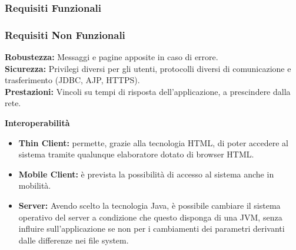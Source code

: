 \documentclass[a4paper,12pt]{beamer}
\begin{document}
\begin{frame}
\frametitle{Requisiti Funzionali}

\begin{center}
\end{center}

\end{frame}

\begin{frame}
\frametitle{Requisiti Non Funzionali}
\textbf{Robustezza:} Messaggi e pagine apposite in caso di errore. \\
\textbf{Sicurezza:} Privilegi diversi per gli utenti, protocolli diversi di comunicazione e trasferimento (JDBC, AJP, HTTPS). \\
\textbf{Prestazioni:} Vincoli su tempi di risposta dell'applicazione, a prescindere dalla rete.

\textbf{Interoperabilità}
\begin{itemize}
\item \textbf{Thin Client:} permette, grazie alla tecnologia HTML, di poter accedere al sistema tramite qualunque elaboratore dotato di browser HTML.
\item \textbf{Mobile Client:} è prevista la possibilità di accesso al sistema anche in mobilità.
\item \textbf{Server:} Avendo scelto la tecnologia Java, è possibile cambiare il sistema operativo del server a condizione che questo disponga di una JVM, senza influire sull'applicazione se non per i cambiamenti dei parametri derivanti dalle differenze nei file system.
\end{itemize}
\end{frame}
\end{document}
